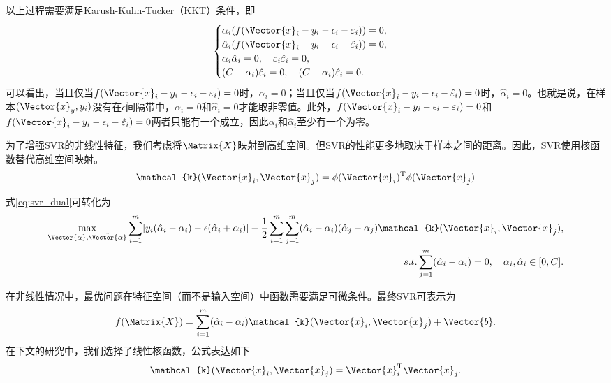 以上过程需要满足Karush-Kuhn-Tucker（KKT）条件，即
\begin{equation}
  \label{eq:svr_kkt}
  \begin{cases}
    \alpha_i(f(\Vector{x}_i-y_i-\epsilon_i-\varepsilon_i))=0,\\
    \hat{\alpha}_i(f(\Vector{x}_i-y_i-\epsilon_i-\hat{\varepsilon}_i))=0,\\
    \alpha_i\hat{\alpha}_i=0,\quad  \varepsilon_i\hat{\varepsilon}_i=0,\\
    (C-\alpha_i)\hat{\varepsilon}_i=0,\quad  (C-\alpha_i)\hat{\varepsilon}_i=0.
  \end{cases}
\end{equation}
可以看出，当且仅当$f(\Vector{x}_i-y_i-\epsilon_i-\varepsilon_i)=0$时，$\alpha_i=0$；当且仅当$f(\Vector{x}_i-y_i-\epsilon_i-\hat{\varepsilon}_i)=0$时，$\hat{\alpha}_i=0$。也就是说，在样本$(\Vector{x}_y,y_i)$没有在$\epsilon$间隔带中，$\alpha_i=0$和$\hat{\alpha}_i=0$才能取非零值。此外，$f(\Vector{x}_i-y_i-\epsilon_i-\varepsilon_i)=0$和$f(\Vector{x}_i-y_i-\epsilon_i-\hat{\varepsilon}_i)=0$两者只能有一个成立，因此$\alpha_i$和$\hat{\alpha}_i$至少有一个为零。

为了增强SVR的非线性特征，我们考虑将$\Matrix{X}$映射到高维空间。但SVR的性能更多地取决于样本之间的距离。因此，SVR使用核函数替代高维空间映射。
\begin{equation}
  \label{eq:svr_kernel}
   \mathcal{k}(\Vector{x}_i,\Vector{x}_j)=\phi(\Vector{x}_i)^{\text{T}}\phi(\Vector{x}_j)
\end{equation}

式\ref{eq:svr_dual}可转化为
\begin{equation}
  \label{eq:svr_dual_kernel}
  \begin{split}
  \max\limits_{\Vector{\alpha},\hat{\Vector{\alpha}}}\sum_{i=1}^{m}[y_i(\hat{\alpha}_i-\alpha_i)-\epsilon(\hat{\alpha}_i+\alpha_i)]-\frac{1}{2}\sum_{i=1}^{m}\sum_{j=1}^{m}(\hat{\alpha}_i-\alpha_i)(\hat{\alpha}_j-\alpha_j)\mathcal{k}(\Vector{x}_i,\Vector{x}_j),\\
  s.t. 
  \sum_{j=1}^{m}(\hat{\alpha}_i-\alpha_i)=0, \quad \alpha_i, \hat{\alpha}_i\in[0,C].
  \end{split}
\end{equation}

在非线性情况中，最优问题在特征空间（而不是输入空间）中函数需要满足可微条件。最终SVR可表示为
\begin{equation}
  \label{eq:svr_kernel_v2}
  f(\Matrix{X})=\sum_{i=1}^{m}(\hat{\alpha}_i-\alpha_i)\mathcal{k}(\Vector{x}_i,\Vector{x}_j)+\Vector{b}.
\end{equation}
在下文的研究中，我们选择了线性核函数，公式表达如下
\begin{equation}
  \label{eq:svr_kernel_linear}
  \mathcal{k}(\Vector{x}_i,\Vector{x}_j)=\Vector{x}_i^{\text{T}}\Vector{x}_j.
\end{equation}



